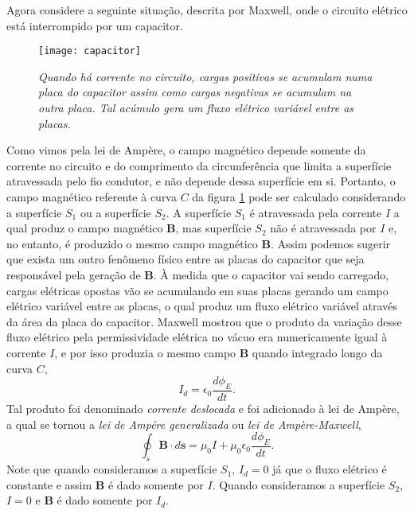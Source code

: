 Agora considere a seguinte situação, descrita por Maxwell, onde o circuito elétrico está interrompido por um capacitor. 
\begin{figure}
\centering
\texttt{[image: capacitor]}
\caption{\textit{Quando há corrente no circuito, cargas positivas se acumulam numa placa do capacitor assim como cargas negativas se acumulam na outra placa. Tal acúmulo gera um fluxo elétrico variável entre as placas.}}
\label{fig.capacitor}
\end{figure}
Como vimos pela lei de Ampère, o campo magnético depende somente da corrente no circuito e do comprimento da circunferência que limita a superfície atravessada pelo fio condutor, e não depende dessa superfície em si. Portanto, o campo magnético referente à curva $C$ da figura \ref{fig.capacitor} pode ser calculado considerando a superfície $S_1$ ou a superfície $S_2$. A superfície $S_1$ é atravessada pela corrente $I$ a qual produz o campo magnético $\mathbf{B}$, mas superfície $S_2$ não é atravessada por $I$ e, no entanto, é produzido o mesmo campo magnético $\mathbf{B}$. Assim podemos sugerir que exista um outro fenômeno físico entre as placas do capacitor que seja responsável pela geração de $\mathbf{B}$. À medida que o capacitor vai sendo carregado, cargas elétricas opostas vão se acumulando em suas placas gerando um campo elétrico variável entre as placas, o qual produz um fluxo elétrico variável através da área da placa do capacitor. Maxwell mostrou que o produto da variação desse fluxo elétrico pela permissividade elétrica no vácuo era numericamente igual à corrente $I$, e por isso produzia o mesmo campo $\mathbf{B}$ quando integrado longo da curva $C$,
\begin{equation*}
I_d=\epsilon_0\frac{d\phi_E}{dt}.
\end{equation*}
Tal produto foi denominado \textit{corrente deslocada} e foi adicionado à lei de Ampère, a qual se tornou a \textit{lei de Ampére generalizada} ou \textit{lei de Ampère-Maxwell},
\begin{equation}\label{eq.ampere_generalizada}
\oint_s\mathbf{B}\cdot d\mathbf{s}=\mu_0I+\mu_0\epsilon_0\frac{d\phi_E}{dt}.
\end{equation}
Note que quando consideramos a superfície $S_1$, $I_d=0$ já que o fluxo elétrico é constante e assim $\mathbf{B}$ é dado somente por $I$. Quando consideramos a superfície $S_2$, $I=0$ e $\mathbf{B}$ é dado somente por $I_d$. 




